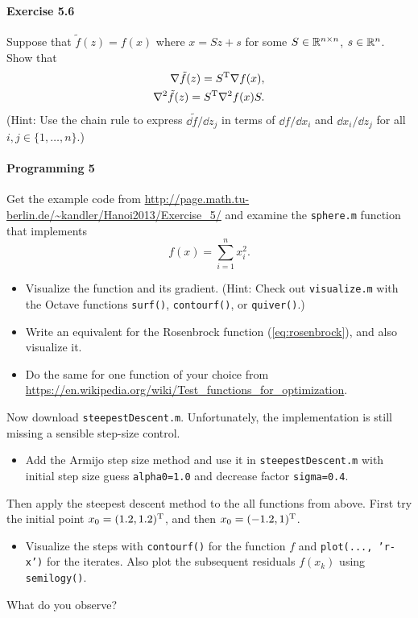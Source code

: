 \paragraph{Exercise 5.6} %
Suppose that $\tilde{f}(z) = f(x)$ where $x=Sz + s$ for some $S\in\mathbb{R}^{n\times
n}$, $s\in\mathbb{R}^n$. Show that
\[
  \begin{split}
  \nabla\tilde{f}(z) = S^{\operatorname{T}} \nabla f(x),\\
  \nabla^2\tilde{f}(z) = S^{\operatorname{T}} \nabla^2 f(x) S.
\end{split}
\]
(Hint: Use the chain rule to express $\dd \tilde{f}/\dd z_j$ in terms of $\dd f/\dd x_i$ and $\dd x_i/\dd z_j$ for all $i, j\in\{1,\dots,n\}$.)

\paragraph{Programming 5}  %
Get the example code from \url{http://page.math.tu-berlin.de/~kandler/Hanoi2013/Exercise_5/} and examine the \texttt{sphere.m} function that implements
\[
  f(x) = \sum_{i=1}^n x_i^2.
\]
\begin{itemize}
  \item Visualize the function and its gradient. (Hint: Check out
    \texttt{visualize.m} with the Octave functions \texttt{surf()},
    \texttt{contourf()}, or \texttt{quiver()}.)
  \item Write an equivalent for the Rosenbrock function (\ref{eq:rosenbrock}),
    and also visualize it.
  \item Do the same for one function of your choice from
    \url{https://en.wikipedia.org/wiki/Test_functions_for_optimization}.
\end{itemize}

Now download \texttt{steepestDescent.m}. Unfortunately, the implementation is
still missing a sensible step-size control.
\begin{itemize}
  \item Add the Armijo step size method and use it in
    \texttt{steepestDescent.m} with initial step size guess
    \texttt{alpha0=1.0} and decrease factor \texttt{sigma=0.4}.
\end{itemize}
Then apply the steepest descent method to the all functions from above.  First
try the initial point $x_0=(1.2, 1.2)^{\operatorname{T}}$, and then $x_0=(-1.2, 1)^{\operatorname{T}}$.
\begin{itemize}
  \item Visualize the steps with \texttt{contourf()} for the function $f$ and
    \texttt{plot(..., 'r-x')} for the iterates. Also plot the subsequent
    residuals $f(x_k)$ using \texttt{semilogy()}.
\end{itemize}
What do you observe?

